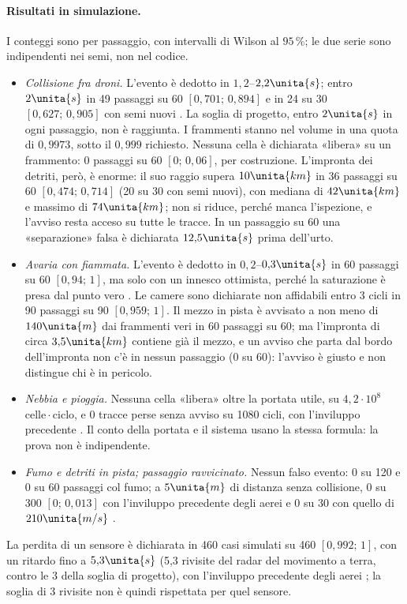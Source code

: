 \paragraph{Risultati in simulazione.} I conteggi sono per passaggio, con intervalli di Wilson al $95\,\%$; le due serie sono indipendenti nei semi, non nel codice.
\begin{itemize}
\item \emph{Collisione fra droni.} %
L'evento è dedotto in $1{,}2$--$2{,}2\unita{s}$; entro $2\unita{s}$ in 49 passaggi su 60 $[0{,}701;\,0{,}894]$ e in 24 su 30 $[0{,}627;\,0{,}905]$ con semi nuovi . La soglia di progetto, entro $2\unita{s}$ in ogni passaggio, non è raggiunta. I frammenti stanno nel volume in una quota di $0{,}9973$, sotto il $0{,}999$ richiesto. Nessuna cella è dichiarata «libera» su un frammento: 0 passaggi su 60 $[0;\,0{,}06]$, per costruzione. L'impronta dei detriti, però, è enorme: il suo raggio supera $10\unita{km}$ in 36 passaggi su 60 $[0{,}474;\,0{,}714]$ (20 su 30 con semi nuovi), con mediana di $42\unita{km}$ e massimo di $74\unita{km}$; non si riduce, perché manca l'ispezione, e l'avviso resta acceso su tutte le tracce. In un passaggio su 60 una «separazione» falsa è dichiarata $12{,}5\unita{s}$ prima dell'urto.
\item \emph{Avaria con fiammata.} L'evento è dedotto in $0{,}2$--$0{,}3\unita{s}$ in 60 passaggi su 60 $[0{,}94;\,1]$, ma solo con un innesco ottimista, perché la saturazione è presa dal punto vero . Le camere sono dichiarate non affidabili entro 3 cicli in 90 passaggi su 90 $[0{,}959;\,1]$. Il mezzo in pista è avvisato a non meno di $140\unita{m}$ dai frammenti veri in 60 passaggi su 60; ma l'impronta di circa $3{,}5\unita{km}$ contiene già il mezzo, e un avviso che parta dal bordo dell'impronta non c'è in nessun passaggio (0 su 60): l'avviso è giusto e non distingue chi è in pericolo.
\item \emph{Nebbia e pioggia.} Nessuna cella «libera» oltre la portata utile, su $4{,}2\cdot10^8$ celle\,$\cdot$\,ciclo, e 0 tracce perse senza avviso su 1080 cicli, con l'inviluppo precedente . Il conto della portata e il sistema usano la stessa formula: la prova non è indipendente.
\item \emph{Fumo e detriti in pista; passaggio ravvicinato.} Nessun falso evento: 0 su 120 e 0 su 60 passaggi col fumo; a $5\unita{m}$ di distanza senza collisione, 0 su 300 $[0;\,0{,}013]$ con l'inviluppo precedente degli aerei e 0 su 30 con quello di $210\unita{m/s}$ .
\end{itemize}
La perdita di un sensore è dichiarata in 460 casi simulati su 460 $[0{,}992;\,1]$, con un ritardo fino a $5{,}3\unita{s}$ (5,3 rivisite del radar del movimento a terra, contro le 3 della soglia di progetto), con l'inviluppo precedente degli aerei ; la soglia di 3 rivisite non è quindi rispettata per quel sensore.

